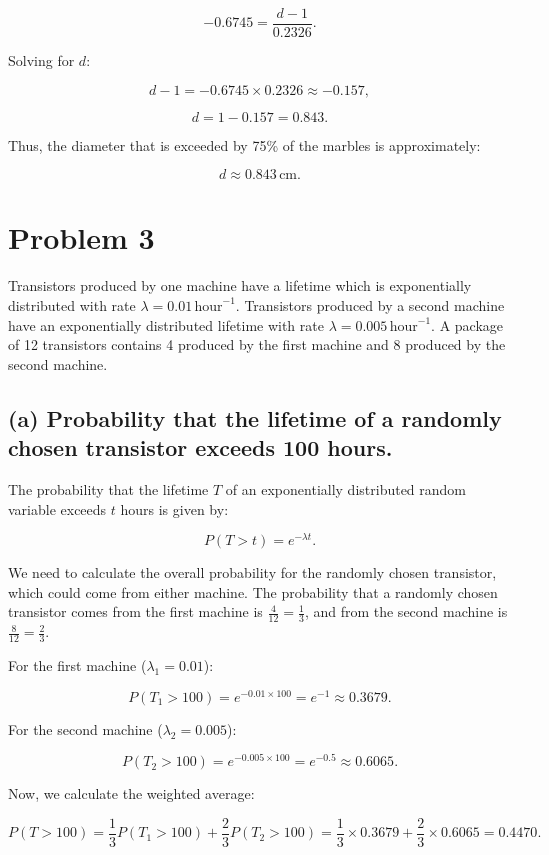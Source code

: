 \documentclass{article} %
\begin{document}
\[
-0.6745 = \frac{d - 1}{0.2326}.
\]

Solving for \( d \):

\[
d - 1 = -0.6745 \times 0.2326 \approx -0.157,
\]

\[
d = 1 - 0.157 = 0.843.
\]

Thus, the diameter that is exceeded by 75\% of the marbles is approximately:

\[
d \approx 0.843 \, \text{cm}.
\]

\section*{Problem 3}

Transistors produced by one machine have a lifetime which is exponentially distributed with rate \( \lambda = 0.01 \, \text{hour}^{-1} \). Transistors produced by a second machine have an exponentially distributed lifetime with rate \( \lambda = 0.005 \, \text{hour}^{-1} \). A package of 12 transistors contains 4 produced by the first machine and 8 produced by the second machine.

\subsection*{(a) Probability that the lifetime of a randomly chosen transistor exceeds 100 hours.}

The probability that the lifetime \( T \) of an exponentially distributed random variable exceeds \( t \) hours is given by:

\[
P(T > t) = e^{-\lambda t}.
\]

We need to calculate the overall probability for the randomly chosen transistor, which could come from either machine. The probability that a randomly chosen transistor comes from the first machine is \( \frac{4}{12} = \frac{1}{3} \), and from the second machine is \( \frac{8}{12} = \frac{2}{3} \).

For the first machine (\( \lambda_1 = 0.01 \)):

\[
P(T_1 > 100) = e^{-0.01 \times 100} = e^{-1} \approx 0.3679.
\]

For the second machine (\( \lambda_2 = 0.005 \)):

\[
P(T_2 > 100) = e^{-0.005 \times 100} = e^{-0.5} \approx 0.6065.
\]

Now, we calculate the weighted average:

\[
P(T > 100) = \frac{1}{3} P(T_1 > 100) + \frac{2}{3} P(T_2 > 100)
= \frac{1}{3} \times 0.3679 + \frac{2}{3} \times 0.6065
= 0.4470.
\]
\end{document}
